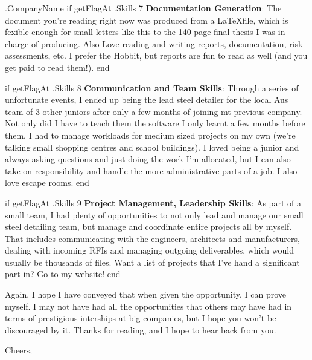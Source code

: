\documentclass[10pt]{letter}
\begin{document}
\begin{letter}{
    {{ .CompanyName }}
}
{{ if getFlagAt .Skills 7 }}
\textbf{Documentation Generation}: The document you're reading right now was produced from a \LaTeX file, which is fexible enough for small letters like this to the 140 page final thesis I was in charge of producing. Also Love reading and writing reports, documentation, risk assessments, etc. I prefer the Hobbit, but reports are fun to read as well (and you get paid to read them!). 
{{ end }}

{{ if getFlagAt .Skills 8 }}
\textbf{Communication and Team Skills}: Through a series of unfortunate events, I ended up being the lead steel detailer for the local Aus team of 3 other juniors after only a few months of joining mt previous company. Not only did I have to teach them the software I only learnt a few months before them, I had to manage workloads for medium sized projects on my own (we're talking small shopping centres and school buildings). I loved being a junior and always asking questions and just doing the work I'm allocated, but I can also take on responsibility and handle the more administrative parts of a job. I also love escape rooms. 
{{ end }}

{{ if getFlagAt .Skills 9 }}
\textbf{Project Management, Leadership Skills}: As part of a small team, I had plenty of opportunities to not only lead and manage our small steel detailing team, but manage and coordinate entire projects all by myself. That includes communicating with the engineers, architects and manufacturers, dealing with incoming RFIs and managing outgoing deliverables, which would usually be thousands of files. Want a list of projects that I've hand a significant part in? Go to my website!
{{ end }}

Again, I hope I have conveyed that when given the opportunity, I can prove myself. I may not have had all the opportunities that others may have had in terms of prestigious interships at big companies, but I hope you won't be discouraged by it. Thanks for reading, and I hope to hear back from you. 


\closing{Cheers,}

\end{letter}
\end{document}

